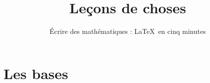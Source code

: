 



\newcommand{\mytext}[1]{{\color{black}{#1}}}
\newcommand{\myverb}[1]{\verb#1}
%\newcommand{\myverb}[1]{$#1$}
\newcommand{\mylatex}[1]{{\color{myred}{#1}}}







\title{{\bf Leçons de choses}}
\subtitle{\'Ecrire des mathématiques : \LaTeX\ en cinq minutes}

\begin{frame}
  
  \debutmontitre

% 

\end{frame}

\setcounter{framenumber}{0}





\section{Les bases}

